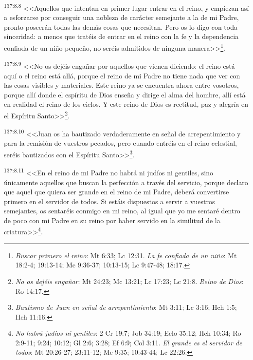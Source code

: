 \par 
\textsuperscript{137:8.8} <<Aquellos que intentan en primer lugar entrar en el reino, y empiezan así a esforzarse por conseguir una nobleza de carácter semejante a la de mi Padre, pronto poseerán todas las demás cosas que necesitan. Pero os lo digo con toda sinceridad: a menos que tratéis de entrar en el reino con la fe y la dependencia confiada de un niño pequeño, no seréis admitidos de ninguna manera>>\footnote{\textit{Buscar primero el reino}: Mt 6:33; Lc 12:31. \textit{La fe confiada de un niño}: Mt 18:2-4; 19:13-14; Mc 9:36-37; 10:13-15; Lc 9:47-48; 18:17.}.

\par 
\textsuperscript{137:8.9} <<No os dejéis engañar por aquellos que vienen diciendo: el reino está aquí o el reino está allá, porque el reino de mi Padre no tiene nada que ver con las cosas visibles y materiales. Este reino ya se encuentra ahora entre vosotros, porque allí donde el espíritu de Dios enseña y dirige el alma del hombre, allí está en realidad el reino de los cielos. Y este reino de Dios es rectitud, paz y alegría en el Espíritu Santo>>\footnote{\textit{No os dejéis engañar}: Mt 24:23; Mc 13:21; Lc 17:23; Lc 21:8. \textit{Reino de Dios}: Ro 14:17.}.

\par 
\textsuperscript{137:8.10} <<Juan os ha bautizado verdaderamente en señal de arrepentimiento y para la remisión de vuestros pecados, pero cuando entréis en el reino celestial, seréis bautizados con el Espíritu Santo>>\footnote{\textit{Bautismo de Juan en señal de arrepentimiento}: Mt 3:11; Lc 3:16; Hch 1:5; Hch 11:16.}.

\par 
\textsuperscript{137:8.11} <<En el reino de mi Padre no habrá ni judíos ni gentiles, sino únicamente aquellos que buscan la perfección a través del servicio, porque declaro que aquel que quiera ser grande en el reino de mi Padre, deberá convertirse primero en el servidor de todos. Si estáis dispuestos a servir a vuestros semejantes, os sentaréis conmigo en mi reino, al igual que yo me sentaré dentro de poco con mi Padre en su reino por haber servido en la similitud de la criatura>>\footnote{\textit{No habrá judíos ni gentiles}: 2 Cr 19:7; Job 34:19; Eclo 35:12; Hch 10:34; Ro 2:9-11; 9:24; 10:12; Gl 2:6; 3:28; Ef 6:9; Col 3:11. \textit{El grande es el servidor de todos}: Mt 20:26-27; 23:11-12; Mc 9:35; 10:43-44; Lc 22:26.}.

